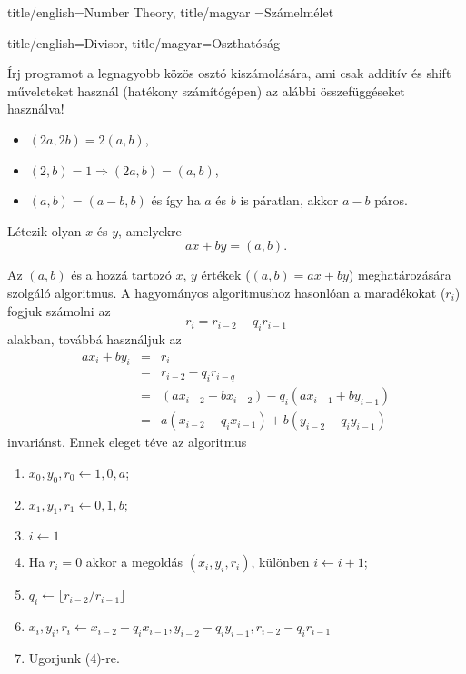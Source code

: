 \documentclass{amsbook}
\begin{document}
\begin{Part*}{
    title/english=Number Theory,
    title/magyar =Számelmélet}
\begin{Section}{
    title/english=Divisor,
    title/magyar=Oszthatóság}
  \begin{exercise} Írj programot a legnagyobb közös osztó kiszámolására, ami
    csak additív és shift műveleteket használ (hatékony
    számítógépen) az alábbi összefüggéseket használva!
    \begin{itemize}
      \item $(2a,2b) = 2(a,b)$,
      \item $(2,b)=1 \Rightarrow (2a,b) = (a,b)$,
      \item $(a,b) = (a-b,b)$ és így ha $a$ és $b$ is páratlan, akkor $a-b$
        páros.
    \end{itemize}
  \end{exercise}

  \begin{theorem} 
    Létezik olyan $x$ és $y$, amelyekre \[ ax+by=(a,b). \]
  \end{theorem}
  
  \begin{definition} 
    Az $(a,b)$ és a hozzá tartozó $x$, $y$ értékek ($(a,b)=ax+by$) meghatározására szolgáló
    algoritmus. A hagyományos algoritmushoz hasonlóan a maradékokat ($r_i$)
    fogjuk számolni az \[r_i = r_{i-2} - q_ir_{i-1}\] alakban, továbbá használjuk
    az \[
      \begin{array}{rcl}
        ax_i+by_i & = & r_i \\
                  & = & r_{i-2} - q_ir_{i-q} \\
                  & = & (ax_{i-2} + bx_{i-2}) - q_i(ax_{i-1} + by_{i-1}) \\
                  & = & a(x_{i-2} - q_ix_{i-1}) + b(y_{i-2} - q_iy_{i-1})
      \end{array}
    \] invariánst. Ennek eleget téve az algoritmus
    \begin{enumerate}
      \item $x_0, y_0, r_0 \leftarrow 1, 0, a$;
      \item $x_1, y_1, r_1 \leftarrow 0, 1, b$;
      \item $i \leftarrow 1$
      \item Ha $r_i = 0$ akkor a megoldás $(x_i,y_i,r_i)$, különben $i\leftarrow i+1$;
      \item $q_i \leftarrow \lfloor r_{i-2}/r_{i-1}\rfloor$
      \item $x_i, y_i, r_i \leftarrow x_{i-2}-q_ix_{i-1}, y_{i-2}-q_iy_{i-1},
        r_{i-2}-q_ir_{i-1}$
      \item Ugorjunk (4)-re.
    \end{enumerate}
  \end{definition}


\end{Section}
\end{Part*}
\end{document}
